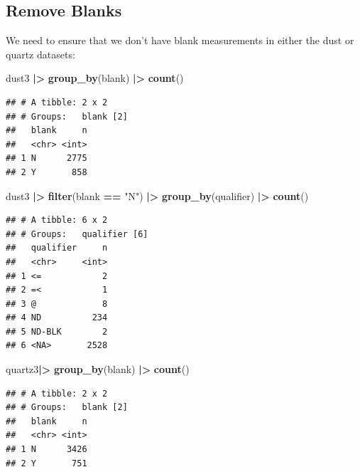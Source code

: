 \documentclass[
]{article}
\newenvironment{Shaded}{\begin{snugshade}}{\end{snugshade}}
\newcommand{\FunctionTok}[1]{\textcolor[rgb]{0.13,0.29,0.53}{\textbf{#1}}}
\newcommand{\NormalTok}[1]{#1}
\newcommand{\SpecialCharTok}[1]{\textcolor[rgb]{0.81,0.36,0.00}{\textbf{#1}}}
\newcommand{\StringTok}[1]{\textcolor[rgb]{0.31,0.60,0.02}{#1}}
\begin{document}
\subsection{Remove Blanks}\label{remove-blanks}

We need to ensure that we don't have blank measurements in either the
dust or quartz datasets:

\begin{Shaded}
\begin{Highlighting}[]
\NormalTok{dust3 }\SpecialCharTok{|\textgreater{}} 
  \FunctionTok{group\_by}\NormalTok{(blank) }\SpecialCharTok{|\textgreater{}} 
  \FunctionTok{count}\NormalTok{() }
\end{Highlighting}
\end{Shaded}

\begin{verbatim}
## # A tibble: 2 x 2
## # Groups:   blank [2]
##   blank     n
##   <chr> <int>
## 1 N      2775
## 2 Y       858
\end{verbatim}

\begin{Shaded}
\begin{Highlighting}[]
\NormalTok{dust3 }\SpecialCharTok{|\textgreater{}} 
  \FunctionTok{filter}\NormalTok{(blank }\SpecialCharTok{==} \StringTok{"N"}\NormalTok{) }\SpecialCharTok{|\textgreater{}} 
  \FunctionTok{group\_by}\NormalTok{(qualifier) }\SpecialCharTok{|\textgreater{}} 
  \FunctionTok{count}\NormalTok{()}
\end{Highlighting}
\end{Shaded}

\begin{verbatim}
## # A tibble: 6 x 2
## # Groups:   qualifier [6]
##   qualifier     n
##   <chr>     <int>
## 1 <=            2
## 2 =<            1
## 3 @             8
## 4 ND          234
## 5 ND-BLK        2
## 6 <NA>       2528
\end{verbatim}

\begin{Shaded}
\begin{Highlighting}[]
\NormalTok{quartz3}\SpecialCharTok{|\textgreater{}} 
  \FunctionTok{group\_by}\NormalTok{(blank) }\SpecialCharTok{|\textgreater{}} 
  \FunctionTok{count}\NormalTok{()  }
\end{Highlighting}
\end{Shaded}

\begin{verbatim}
## # A tibble: 2 x 2
## # Groups:   blank [2]
##   blank     n
##   <chr> <int>
## 1 N      3426
## 2 Y       751
\end{verbatim}
\end{document}
